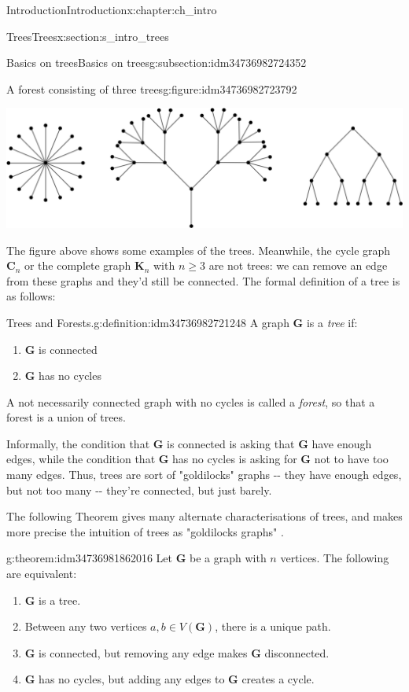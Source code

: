 \documentclass[oneside,10pt,]{book}
\numberwithin{equation}{section}
\newcommand{\bfC}{\mathbf{C}}
\newcommand{\bfG}{\mathbf{G}}
\newcommand{\bfK}{\mathbf{K}}
\begin{document}
\begin{chapterptx}{Introduction}{}{Introduction}{}{}{x:chapter:ch_intro}
\begin{sectionptx}{Trees}{}{Trees}{}{}{x:section:s_intro_trees}
\begin{subsectionptx}{Basics on trees}{}{Basics on trees}{}{}{g:subsection:idm34736982724352}
\begin{figureptx}{A forest consisting of three trees}{g:figure:idm34736982723792}{}
\begin{image}{0.1}{0.8}{0.1}
\includegraphics[width=\linewidth]{images/forest.png}
\end{image}%
\tcblower
\end{figureptx}%
The figure above shows some examples of the trees.  Meanwhile, the cycle graph \(\bfC_n\) or the complete graph \(\bfK_n\) with \(n\geq 3\) are not trees: we can remove an edge from these graphs and they'd still be connected. The formal definition of a tree is as follows:%
\begin{definition}{Trees and Forests.}{g:definition:idm34736982721248}%
A graph \(\bfG\) is a \emph{tree} if:%
%
\begin{enumerate}
\item{}\(\bfG\) is connected%
\item{}\(\bfG\) has no cycles%
\end{enumerate}
A not necessarily connected graph with no cycles is called a \emph{forest}, so that a forest is a union of trees.%
\end{definition}
Informally, the condition that \(\bfG\) is connected is asking that \(\bfG\) have enough edges, while the condition that \(\bfG\) has no cycles is asking for \(\bfG\) not to have too many edges.  Thus, trees are sort of "goldilocks" graphs -{}-{} they have enough edges, but not too many -{}-{} they're connected, but just barely.%
\par
The following Theorem gives many alternate characterisations of trees, and makes more precise the intuition of trees as "goldilocks graphs"%
. \begin{theorem}{}{}{g:theorem:idm34736981862016}%
Let \(\bfG\) be a graph with \(n\) vertices.  The following are equivalent:%
%
\begin{enumerate}
\item{}\(\bfG\) is a tree.%
\item{}Between any two vertices \(a,b\in V(\bfG)\), there is a unique path.%
\item{}\(\bfG\) is connected, but removing any edge makes \(\bfG\) disconnected.%
\item{}\(\bfG\) has no cycles, but adding any edges to \(\bfG\) creates a cycle.%

\end{enumerate}
\end{theorem}
\end{subsectionptx}
\end{sectionptx}
\end{chapterptx}
\end{document}
